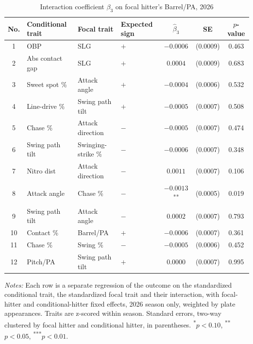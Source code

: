 \begin{table}[htbp]
\centering
\small
\caption{Interaction coefficient $\beta_3$ on focal hitter's Barrel/PA, 2026}
\label{tab:table1_barrel_2026}
\begin{tabular}{clllccc}
\toprule
No. & Conditional trait & Focal trait & Expected sign & $\hat\beta_3$ & SE & $p$-value \\
\midrule
1 & OBP & SLG & $+$ & $-0.0006$ & (0.0009) & 0.463 \\
2 & Abs contact gap & SLG & $+$ & $0.0004$ & (0.0009) & 0.683 \\
3 & Sweet spot \% & Attack angle & $+$ & $-0.0004$ & (0.0006) & 0.532 \\
4 & Line-drive \% & Swing path tilt & $+$ & $-0.0005$ & (0.0007) & 0.508 \\
5 & Chase \% & Attack direction & $-$ & $-0.0005$ & (0.0007) & 0.474 \\
6 & Swing path tilt & Swinging-strike \% & $-$ & $-0.0006$ & (0.0007) & 0.348 \\
7 & Nitro dist & Attack direction & $-$ & $0.0011$ & (0.0007) & 0.106 \\
8 & Attack angle & Chase \% & $-$ & $-0.0013$\textsuperscript{**} & (0.0005) & 0.019 \\
9 & Swing path tilt & Attack angle & $-$ & $0.0002$ & (0.0007) & 0.793 \\
10 & Contact \% & Barrel/PA & $+$ & $-0.0006$ & (0.0007) & 0.361 \\
11 & Chase \% & Swing \% & $-$ & $-0.0005$ & (0.0006) & 0.452 \\
12 & Pitch/PA & Swing path tilt & $+$ & $0.0000$ & (0.0007) & 0.995 \\
\bottomrule
\end{tabular}
\par\smallskip\parbox{0.95\textwidth}{\footnotesize \textit{Notes:} Each row is a separate regression of the outcome on the standardized conditional trait, the standardized focal trait and their interaction, with focal-hitter and conditional-hitter fixed effects, 2026 season only, weighted by plate appearances. Traits are z-scored within season. Standard errors, two-way clustered by focal hitter and conditional hitter, in parentheses. \textsuperscript{*}$p<0.10$, \textsuperscript{**}$p<0.05$, \textsuperscript{***}$p<0.01$.}
\end{table}
